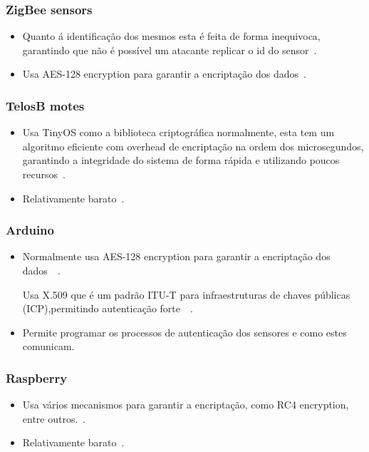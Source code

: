 \subsubsection{ZigBee sensors}
\begin{itemize}
\item Quanto á identificação dos mesmos esta é feita de forma inequivoca, garantindo que não é possível um atacante replicar o id do sensor~\cite{ref_url1}.\newline 
\item Usa AES-128 encryption para garantir a encriptação dos dados~\cite{ref_url1}.
\end{itemize}
\subsubsection{TelosB motes}
\begin{itemize}
\item Usa TinyOS como a biblioteca criptográfica normalmente, esta tem um algoritmo eficiente com overhead de encriptação na ordem dos microsegundos, garantindo a integridade do sistema de forma rápida e utilizando poucos recursos~\cite{ref_url2}.\newline
\item Relativamente barato~\cite{ref_url2}.
\end{itemize}
\subsubsection{Arduino}
\begin{itemize}
\item Normalmente usa AES-128 encryption para garantir a encriptação dos dados~\cite{ref_url3.1}~\cite{ref_url3.2}.\newline
\par Usa X.509 que é um padrão ITU-T para infraestruturas de chaves públicas (ICP),permitindo autenticação forte~\cite{ref_url3.3}~\cite{ref_url3.4}.
\item Permite programar os processos de autenticação dos sensores e como estes comunicam. 
\end{itemize}
\subsubsection{Raspberry}
\begin{itemize}
\item Usa vários mecanismos para garantir a encriptação, como RC4 encryption,  entre outros.~\cite{ref_url4.1}.
\item Relativamente barato~\cite{ref_url4}.\newline
\end{itemize}

